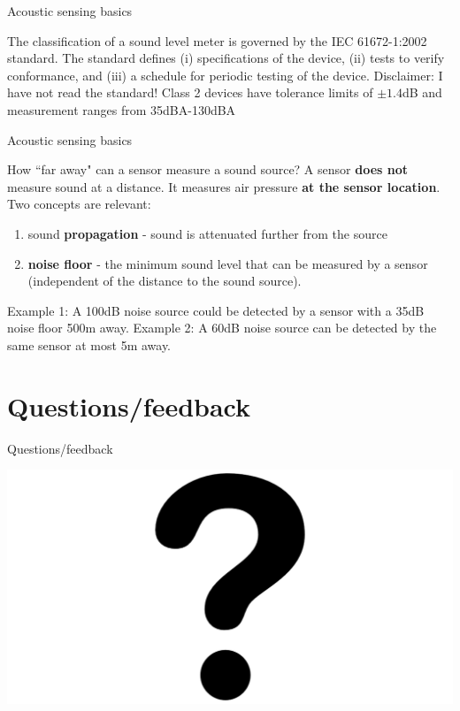 \documentclass{beamer}
\begin{document}
    \begin{frame}{Acoustic sensing basics}
        
        The classification of a sound level meter is governed by the IEC 61672-1:2002 standard.
        \vfill
        The standard defines (i) specifications of the device, (ii) tests to verify conformance, and (iii) a schedule for periodic testing of the device.
        \vfill 
        Disclaimer: I have not read the standard!
        \vfill
        Class 2 devices have tolerance limits of $\pm 1.4$dB and measurement ranges from 35dBA-130dBA
        
    \end{frame}
    
    \begin{frame}{Acoustic sensing basics}
        
        How ``far away" can a sensor measure a sound source?
        \vfill 
        A sensor {\bf does not} measure sound at a distance. It measures air pressure {\bf at the sensor location}.
        \vfill 
        Two concepts are relevant:
        \begin{enumerate}
            \item sound {\bf propagation} - sound is attenuated further from the source
            \item {\bf noise floor} - the minimum sound level that can be measured by a sensor (\alert{independent} of the distance to the sound source).
        \end{enumerate}
        \vfill 
        Example 1: A 100dB noise source could be detected by a sensor with a 35dB noise floor 500m away.   
        \vfill 
        Example 2: A 60dB noise source can be detected by the same sensor at most 5m away. 
    \end{frame}

\section{Questions/feedback}

    \begin{frame}{Questions/feedback}
        \begin{center}
            \includegraphics[scale=0.2]{figures/36601.png}
        \end{center}
    \end{frame}
\end{document}

